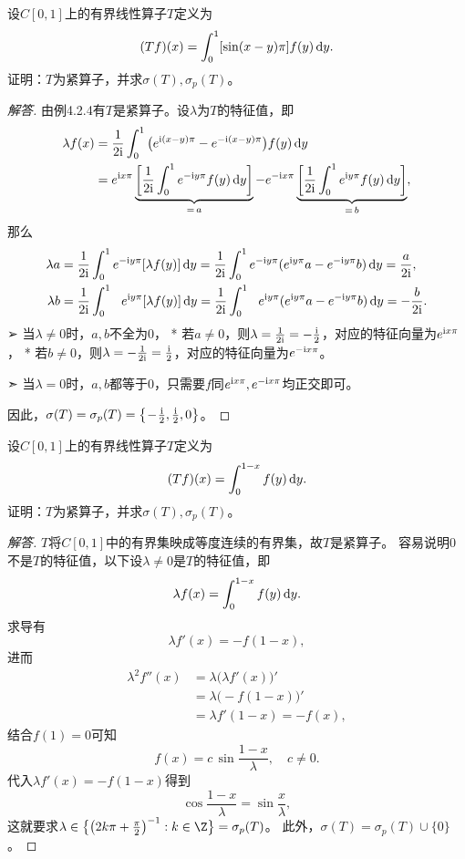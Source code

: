 \begin{10}
    设$C[0,1]$上的有界线性算子$T$定义为
    \[(Tf)(x)=\int_0^1[\sin(x-y)\pi]f(y)\,{\rm d}y.\]
    证明：$T$为紧算子，并求$\sigma(T),\sigma_p(T)$。
\end{10}
\begin{proof}[解答]
    由例4.2.4有$T$是紧算子。设$\lambda$为$T$的特征值，即
    \begin{align*}
        \lambda f(x)&=\frac{1}{2{\rm i}}\int_0^1\big(e^{{\rm i}(x-y)\pi}-e^{-{\rm i}(x-y)\pi}\big)f(y)\,{\rm d}y\\
        &=e^{{\rm i}x\pi}\underbrace{\left[\frac{1}{2{\rm i}}\int_0^1e^{-{\rm i}y\pi}f(y)\,{\rm d}y\right]}_{=\,a}
        -e^{-{\rm i}x\pi}\underbrace{\left[\frac{1}{2{\rm i}}\int_0^1e^{{\rm i}y\pi}f(y)\,{\rm d}y\right]}_{=\,b},
    \end{align*}
    那么
    \begin{align*}
        \lambda a&=\frac{1}{2{\rm i}}\int_0^1e^{-{\rm i}y\pi}[\lambda f(y)]\,{\rm d}y
        =\frac{1}{2{\rm i}}\int_0^1e^{-{\rm i}y\pi}(e^{{\rm i}y\pi}a-e^{-{\rm i}y\pi}b)\,{\rm d}y=\frac{a}{2{\rm i}},\\
        \lambda b&=\frac{1}{2{\rm i}}\int_0^1\ \ e^{{\rm i}y\pi}[\lambda f(y)]\,{\rm d}y
        =\frac{1}{2{\rm i}}\int_0^1\ \ e^{{\rm i}y\pi}(e^{{\rm i}y\pi}a-e^{-{\rm i}y\pi}b)\,{\rm d}y=-\frac{b}{2{\rm i}}.
    \end{align*}
    ➢ 当$\lambda\ne0$时，$a,b$不全为$0$，
    * 若$a\ne0$，则$\lambda=\frac{1}{2{\rm i}}=-\frac{\rm i}{2}$，对应的特征向量为$e^{{\rm i}x\pi}$，
    * 若$b\ne0$，则$\lambda=-\frac{1}{2{\rm i}}=\frac{\rm i}{2}$，对应的特征向量为$e^{-{\rm i}x\pi}$。

    ➣ 当$\lambda=0$时，$a,b$都等于$0$，只需要$f$同$e^{{\rm i}x\pi},e^{-{\rm i}x\pi}$均正交即可。

    因此，$\sigma(T)=\sigma_p(T)=\big\{\!-\!\frac{\rm i}{2},\frac{\rm i}{2},0\big\}$。
\end{proof}

\begin{11}
    设$C[0,1]$上的有界线性算子$T$定义为
    \[(Tf)(x)=\int_0^{1-x}f(y)\,{\rm d}y.\]
    证明：$T$为紧算子，并求$\sigma(T),\sigma_p(T)$。
\end{11}
\begin{proof}[解答]
    $T$将$C[0,1]$中的有界集映成等度连续的有界集，故$T$是紧算子。
    容易说明$0$不是$T$的特征值，以下设$\lambda\ne0$是$T$的特征值，即
    \[\lambda f(x)=\int_0^{1-x}f(y)\,{\rm d}y.\]
    求导有
    \[\lambda f'(x)=-f(1-x),\]
    进而
    \begin{align*}
        \lambda^2f''(x)&=\lambda\big(\lambda f'(x)\big)'\\
        &=\lambda\big(\!-\!f(1-x)\big)'\\
        &=\lambda f'(1-x)=-f(x),
    \end{align*}
    结合$f(1)=0$可知
    \[f(x)=c\,\sin\frac{1-x}{\lambda}, \quad c\ne0.\]
    代入$\lambda f'(x)=-f(1-x)$得到
    \[\cos\frac{1-x}{\lambda}=\sin\frac{x}{\lambda},\]
    这就要求$\lambda\in\big\{\big(2k\pi+\frac{\pi}{2}\big)^{-1}:k\in\Z\big\}=\sigma_p(T)$。
    此外，$\sigma(T)=\sigma_p(T)\cup\{0\}$。
\end{proof}

